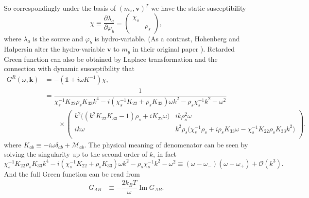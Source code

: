 \documentclass[10pt,nofootinbib]{revtex4}
\begin{document}
		So correspondingly under the basis of $(m_z,\bm{v})^T$ we have the static susceptibility
		\begin{equation}\label{2.3.6}
			\chi\equiv\dfrac{\partial \lambda_a}{\partial \varphi_b}=\left(\begin{array}{cc}
				\chi_s & \\ & \rho_s
			\end{array}\right),
		\end{equation}
		where $\lambda_a$ is the source and $\varphi_b$ is hydro-variable. (As a contrast, Hohenberg and Halpersin alter the hydro-variable $\bm{v}$ to $m_y$ in their original paper \cite{halperin1969hydrodynamic}). Retarded Green function can also be obtained by Laplace transformation and the connection with dynamic susceptibility \cite{kovtun2012lectures} that
		\begin{align}
			G^R(\omega,\bm{k})&=-(\mathds{1}+i\omega K^{-1})\chi,\label{2.3.7}\\
			&=\dfrac{1}{\chi_s^{-1}K_{22}\rho_s K_{33}k^4-i(\chi_s^{-1}K_{22}+\rho_sK_{33})\omega k^2-\rho_s\chi_s^{-1}k^2-\omega^2}\nonumber\\
			&\qquad\times \left(\begin{array}{cc}
				k^2\bigg((k^2 K_{22}
				K_{33}-1) \rho_s+i K_{22}\omega\bigg) & ik \rho_s^2\omega\\
				i k\omega & k^2\rho_s\bigg(\chi_s^{-1}\rho_s+i\rho_sK_{33}\omega-\chi_s^{-1}K_{22}\rho_sK_{33} k^2\bigg)\\
				\end{array}\right).\label{2.3.8}
		\end{align}
		where $K_{ab}\equiv -i\omega\delta_{ab}+\mathcal{M}_{ab}$. The physical meaning of denomenator can be seen by solving the singularity up to the second order of $k$, in fact
		\begin{equation*}
			\chi_s^{-1}K_{22}\rho_s K_{33}k^4-i(\chi_s^{-1}K_{22}+\rho_sK_{33})\omega k^2-\rho_s\chi_s^{-1}k^2-\omega^2\equiv(\omega-\omega_-)(\omega-\omega_+)+\mathcal{O}(k^3).
		\end{equation*}
		And the full Green function can be read from
		\begin{align}
			G_{AB}&\equiv-\dfrac{2k_BT}{\omega}\mathop{\mathrm{Im}}G_{AB}.
		\end{align}
\end{document}
